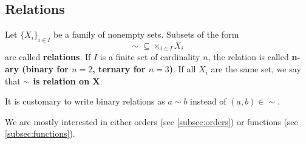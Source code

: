 \subsection{Relations}\label{subsec:relations}

\begin{definition}\label{def:relation}
  Let \( \{ X_i \}_{i \in I} \) be a family of nonempty sets.
  Subsets of the form
  \begin{equation*}
    \sim\; \subseteq \times_{i \in I} X_i
  \end{equation*}
  are called \textbf{relations}. If \( I \) is a finite set of cardinality \( n \), the relation is called \textbf{n-ary (binary for \( n = 2 \), ternary for \( n = 3 \))}. If all \( X_i \) are the same set, we say that \textbf{\( \sim \) is relation on X}.

  It is customary to write binary relations as \( a \sim b \) instead of \( (a, b) \in \sim \).
\end{definition}

\begin{remark}\label{remark:main_relation_types}
  We are mostly interested in either orders (see \cref{subsec:orders}) or functions (see \cref{subsec:functions}).
\end{remark}

